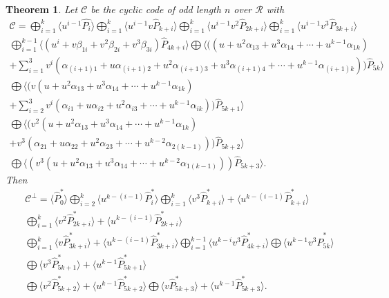 \documentclass{amsart}
\newtheorem{theorem}{Theorem}[section]
\theoremstyle{definition}
\theoremstyle{remark}
\numberwithin{equation}{section}
\begin{document}
    \begin{theorem}\label{th5}
    Let $\mathcal{C}$ be the cyclic code of odd length $n$ over $\mathcal{R}$ with
    \allowdisplaybreaks\begin{gather*}
		\mathcal{C}= \bigoplus_{i=1}^{k}\langle u^{i-1}\hat{P_{i}}\rangle \bigoplus_{i=1}^{k}\langle u^{i-1}v\hat{P}_{k+i}\rangle \bigoplus_{i=1}^{k}\langle u^{i-1}v^2\hat{P}_{2k+i}\rangle  \bigoplus_{i=1}^{k}\langle u^{i-1}v^3\hat{P}_{3k+i}\rangle \\
        \bigoplus_{i=1}^{k-1} \langle (u^i+ v\beta_{1i} + v^2\beta_{2i} + v^3\beta_{3i})\hat{P}_{4k+i}\rangle   \bigoplus \langle ((u + u^2\alpha_{13} + u^3\alpha_{14} + \cdots + u^{k-1}\alpha_{1k}) \\
      + \sum_{i=1}^{3} v^i( \alpha_{(i+1)1} + u\alpha_{(i+1)2} + u^2\alpha_{(i+1)3} + u^3\alpha_{(i+1)4} + \cdots + u^{k-1}\alpha_{(i+1)k} ))\hat{P}_{5k}\rangle
     \\  \bigoplus  \langle (v(u + u^2\alpha_{13} + u^3\alpha_{14} + \cdots + u^{k-1}\alpha_{1k}) \\ + \sum_{i=2}^{3} v^i( \alpha_{i1} + u\alpha_{i2} + u^2\alpha_{i3} + \cdots + u^{k-1}\alpha_{ik} ))\hat{P}_{5k+1} \rangle
     \\  \bigoplus  \langle (v^2(u + u^2\alpha_{13} + u^3\alpha_{14} + \cdots + u^{k-1}\alpha_{1k})
     \\+ v^3( \alpha_{21} + u\alpha_{22} + u^2\alpha_{23} + \cdots + u^{k-2}\alpha_{2(k-1)}))\hat{P}_{5k+2}\rangle
     \\  \bigoplus \langle (v^3(u + u^2\alpha_{13} + u^3\alpha_{14} + \cdots + u^{k-2}\alpha_{1(k-1)}))\hat{P}_{5k+3}\rangle. 
		\end{gather*}
  Then
  \begin{gather*}
    \mathcal{C}^\perp = \langle\hat{P}_{0}^*\rangle \bigoplus_{i=2}^{k}\langle u^{k-(i-1)}\hat{P}_{i}^*\rangle \bigoplus_{i=1}^{k} \langle v^3 \hat{P}_{k+i}^* \rangle + \langle u^{k-(i-1)} \hat{P}_{k+i}^* \rangle \\\bigoplus_{i=1}^{k} \langle v^2 \hat{P}_{2k+i}^* \rangle + \langle u^{k-(i-1)} \hat{P}_{2k+i}^* \rangle \\ \bigoplus_{i=1}^{k} \langle v \hat{P}_{3k+i}^* \rangle + \langle u^{k-(i-1)} \hat{P}_{3k+i}^* \rangle \bigoplus_{i=1}^{k-1} \langle u^{k-i}v^3 \hat{P}_{4k+i}^* \rangle  \bigoplus \langle u^{k-1}v^3 \hat{P}_{5k}^* \rangle\\ \bigoplus \langle v^3 \hat{P}_{5k+1}^* \rangle + \langle u^{k-1} \hat{P}_{5k+1}^* \rangle \\   \bigoplus \langle v^2 \hat{P}_{5k+2}^* \rangle + \langle u^{k-1} \hat{P}_{5k+2}^* \rangle \bigoplus \langle v \hat{P}_{5k+3}^* \rangle + \langle u^{k-1} \hat{P}_{5k+3}^* \rangle.

\end{gather*}
\end{theorem}
\end{document}
